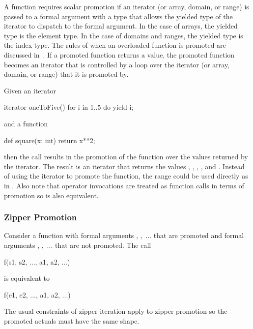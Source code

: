 A function requires scalar promotion if an iterator (or array, domain,
or range) is passed to a formal argument with a type that allows the
yielded type of the iterator to dispatch to the formal argument.  In
the case of arrays, the yielded type is the element type.  In the case
of domains and ranges, the yielded type is the index type.  The rules
of when an overloaded function is promoted are discussed
in~.  If a promoted function returns a
value, the promoted function becomes an iterator that is controlled by
a loop over the iterator (or array, domain, or range) that it is
promoted by.
\begin{example}
Given an iterator
\begin{chapel}
iterator oneToFive() {
  for i in 1..5 do
    yield i;
}
\end{chapel}
and a function
\begin{chapel}
def square(x: int) return x**2;
\end{chapel}
then the call  results in the promotion of
the  function over the values returned by
the  iterator.  The result is an iterator that returns
the values , , , , and .
Instead of using the  iterator to promote
the  function, the range  could be used
directly as in .  Also note that operator
invocations are treated as function calls in terms of promotion
so  is also equivalent.
\end{example}

\subsubsection{Zipper Promotion}
\label{Zipper_Promotion}

Consider a function  with formal
arguments , ,~... that are promoted and formal
arguments , ,~... that are not promoted.  The call
\begin{chapel}
f(s1, s2, ..., a1, a2, ...)
\end{chapel}
is equivalent to
\begin{chapel}
[(e1, e2, ...) in (s1, s2, ...)] f(e1, e2, ..., a1, a2, ...)
\end{chapel}
The usual constraints of zipper iteration apply to zipper promotion so
the promoted actuals must have the same shape.

